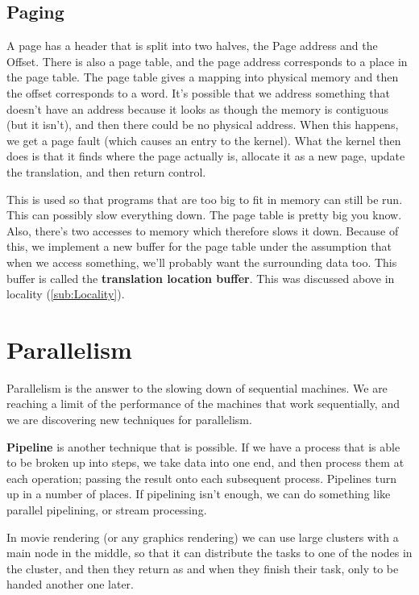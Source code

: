 \documentclass[11pt,a4paper,titlepage,dvipsnames,cmyk]{scrartcl}
\begin{document}
\subsection{Paging}%
\label{sub:Paging}
A page has a header that is split into two halves, the Page address and the
Offset. There is also a page table, and the page address corresponds to a
place in the page table. The page table gives a mapping into physical
memory and then the offset corresponds to a word. It's possible that we
address something that doesn't have an address because it looks as though
the memory is contiguous (but it isn't), and then there could be no
physical address. When this happens, we get a page fault (which causes an
entry to the kernel). What the kernel then does is that it finds where the
page actually is, allocate it as a new page, update the translation, and
then return control.

This is used so that programs that are too big to fit in memory can still
be run. This can possibly slow everything down. The page table is pretty
big you know. Also, there's two accesses to memory which therefore slows
it down. Because of this, we implement a new buffer for the page table
under the assumption that when we access something, we'll probably want
the surrounding data too. This buffer is called the \textbf{translation
location buffer}. This was discussed above in locality
(\ref{sub:Locality}).

\section{Parallelism}%
\label{sec:parallelism}
Parallelism is the answer to the slowing down of sequential machines. We
are reaching a limit of the performance of the machines that work
sequentially, and we are discovering new techniques for parallelism.

\textbf{Pipeline} is another technique that is possible. If we have a
process that is able to be broken up into steps, we take data into one
end, and then process them at each operation; passing the result onto each
subsequent process. Pipelines turn up in a number of places. If pipelining
isn't enough, we can do something like parallel pipelining, or stream
processing.

In movie rendering (or any graphics rendering) we can use large clusters
with a main node in the middle, so that it can distribute the tasks to one
of the nodes in the cluster, and then they return as and when they finish
their task, only to be handed another one later.
\end{document}
